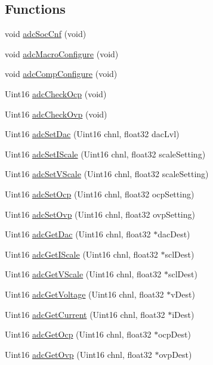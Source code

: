 \subsection*{Functions}
\begin{DoxyCompactItemize}
\item 
void \hyperlink{a00006_af77988a3ac7a924b75e6213631b04d46}{adc\-Soc\-Cnf} (void)
\item 
void \hyperlink{a00006_a3c614312b1f0ce65b46c4d93051de836}{adc\-Macro\-Configure} (void)
\item 
void \hyperlink{a00006_a646e6cc4558594a6fbaa10c767cc4fec}{adc\-Comp\-Configure} (void)
\item 
Uint16 \hyperlink{a00006_a7dfbe5e2625efeeb0768d42d83a71c04}{adc\-Check\-Ocp} (void)
\item 
Uint16 \hyperlink{a00006_a0ad871be22e7987be07a0f4534ef231b}{adc\-Check\-Ovp} (void)
\item 
Uint16 \hyperlink{a00006_aca1e33ca1b293964f5ce58d430e684f0}{adc\-Set\-Dac} (Uint16 chnl, float32 dac\-Lvl)
\item 
Uint16 \hyperlink{a00006_a2dcc5ee51599a4026fc672072a3f8232}{adc\-Set\-I\-Scale} (Uint16 chnl, float32 scale\-Setting)
\item 
Uint16 \hyperlink{a00006_a9c87603c2aabc17d784a9149563e71e5}{adc\-Set\-V\-Scale} (Uint16 chnl, float32 scale\-Setting)
\item 
Uint16 \hyperlink{a00006_ac5c13a2ef6c3a9f9da7bf437e0213da2}{adc\-Set\-Ocp} (Uint16 chnl, float32 ocp\-Setting)
\item 
Uint16 \hyperlink{a00006_a03e263230a1a25337050bfde1172d1a1}{adc\-Set\-Ovp} (Uint16 chnl, float32 ovp\-Setting)
\item 
Uint16 \hyperlink{a00006_a51b43d0fbadcb3b231f4fceb4c7b9d12}{adc\-Get\-Dac} (Uint16 chnl, float32 $\ast$dac\-Dest)
\item 
Uint16 \hyperlink{a00006_acbf7c83ae3b6df7b0812ef1aed2b9c96}{adc\-Get\-I\-Scale} (Uint16 chnl, float32 $\ast$scl\-Dest)
\item 
Uint16 \hyperlink{a00006_a478f6261679944822575231af3eb229c}{adc\-Get\-V\-Scale} (Uint16 chnl, float32 $\ast$scl\-Dest)
\item 
Uint16 \hyperlink{a00006_a47082a746494c4221df1cb453fa746f7}{adc\-Get\-Voltage} (Uint16 chnl, float32 $\ast$v\-Dest)
\item 
Uint16 \hyperlink{a00006_a2cda2df7670a029f25848b9fe6f37bf8}{adc\-Get\-Current} (Uint16 chnl, float32 $\ast$i\-Dest)
\item 
Uint16 \hyperlink{a00006_a8e08c745a25782602c5d337d5eb7b03c}{adc\-Get\-Ocp} (Uint16 chnl, float32 $\ast$ocp\-Dest)
\item 
Uint16 \hyperlink{a00006_a1536739f53a776036e1b9c92990a102a}{adc\-Get\-Ovp} (Uint16 chnl, float32 $\ast$ovp\-Dest)
\end{DoxyCompactItemize}
